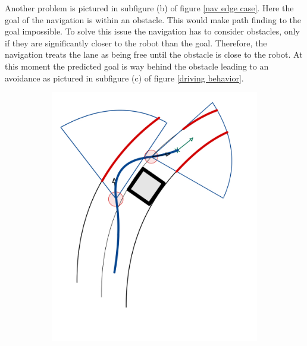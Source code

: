 Another problem is pictured in subfigure (b) of figure \ref{nav edge case}. Here the goal of the navigation is within an obstacle. This would make path finding to the goal impossible. To solve this issue the navigation has to consider obstacles, only if they are significantly closer to the robot than the goal. Therefore, the navigation treats the lane as being free until the obstacle is close to the robot. At this moment the predicted goal is way behind the obstacle leading to an avoidance as pictured in subfigure (c) of figure \ref{driving behavior}. 
\begin{figure}
	\centering
	\begin{subfigure}{.3\linewidth}
		\includegraphics[width=\textwidth]{Pictures/road detection blind}
		

\end{subfigure}
\end{figure}
